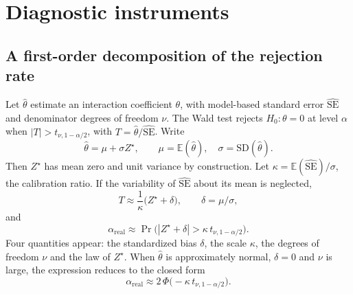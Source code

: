 \documentclass[
  11pt,
]{article}
\begin{document}
\section{Diagnostic instruments}\label{diagnostic-instruments}

\subsection{A first-order decomposition of the rejection rate}\label{a-first-order-decomposition-of-the-rejection-rate}

Let \(\hat\theta\) estimate an interaction coefficient \(\theta\), with
model-based standard error \(\widehat{\mathrm{SE}}\) and denominator
degrees of freedom \(\nu\). The Wald test rejects \(H_0: \theta = 0\) at
level \(\alpha\) when \(|T| > t_{\nu, 1-\alpha/2}\), with
\(T = \hat\theta / \widehat{\mathrm{SE}}\). Write
\begin{equation}
\hat\theta = \mu + \sigma Z^{\star},
\qquad \mu = \mathbb E(\hat\theta), \quad
\sigma = \mathrm{SD}(\hat\theta).
\label{eq:decomp}
\end{equation}
Then \(Z^{\star}\) has mean zero and unit variance by construction. Let
\(\kappa = \mathbb E(\widehat{\mathrm{SE}})/\sigma\), the calibration
ratio. If the variability of \(\widehat{\mathrm{SE}}\) about its mean is
neglected,
\begin{equation}
T \approx \frac{1}{\kappa}\bigl(Z^{\star} + \delta\bigr),
\qquad \delta = \mu/\sigma,
\label{eq:wald}
\end{equation}
and
\begin{equation}
\alpha_{\mathrm{real}} \approx
\Pr\!\bigl(|Z^{\star} + \delta| > \kappa\, t_{\nu, 1-\alpha/2}\bigr).
\label{eq:alpha}
\end{equation}
Four quantities appear: the standardized bias \(\delta\), the scale
\(\kappa\), the degrees of freedom \(\nu\) and the law of \(Z^{\star}\).
When \(\hat\theta\) is approximately normal, \(\delta = 0\) and \(\nu\) is
large, the expression reduces to the closed form
\begin{equation}
\alpha_{\mathrm{real}} \approx 2\,\Phi\!\bigl(-\kappa\,
t_{\nu, 1-\alpha/2}\bigr).
\label{eq:closed}
\end{equation}
\end{document}
